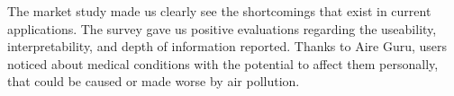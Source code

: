 \begin{itemize}
    \done The market study made us clearly see the shortcomings that exist in current applications.
    \done The survey gave us positive evaluations regarding the useability, interpretability, and depth of information reported.
    \done Thanks to Aire Guru, users noticed about medical conditions with the potential to affect them personally, that could be caused or made worse by air pollution.

\end{itemize}